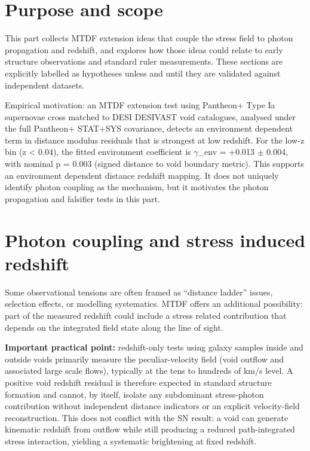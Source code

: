 \documentclass[11pt,a4paper]{article}
\begin{document}
\section{Purpose and scope}
\label{sec:purpose}
This part collects MTDF extension ideas that couple the stress field to photon propagation and redshift, and explores how those ideas could relate to early structure observations and standard ruler measurements.
These sections are explicitly labelled as hypotheses unless and until they are validated against independent datasets.

Empirical motivation: an MTDF extension test using Pantheon+ Type Ia supernovae cross matched to DESI DESIVAST void catalogues, analysed under the full Pantheon+ STAT+SYS covariance, detects an environment dependent term in distance modulus residuals that is strongest at low redshift. For the low-z bin (z < 0.04), the fitted environment coefficient is $\gamma$\_\allowbreak{}env = +0.013 $\pm$ 0.004, with nominal p = 0.003 (signed distance to void boundary metric). This supports an environment dependent distance redshift mapping. It does not uniquely identify photon coupling as the mechanism, but it motivates the photon propagation and falsifier tests in this part.

\section{Photon coupling and stress induced redshift}
\label{sec:photon}
Some observational tensions are often framed as ``distance ladder'' issues, selection effects, or modelling systematics.
MTDF offers an additional possibility: part of the measured redshift could include a stress related contribution that depends on the integrated field state along the line of sight.

\textbf{Important practical point:} redshift-only tests using galaxy samples inside and outside voids primarily measure the peculiar-velocity field (void outflow and associated large scale flows), typically at the tens to hundreds of km/\allowbreak{}s level. A positive void redshift residual is therefore expected in standard structure formation and cannot, by itself, isolate any subdominant stress-photon contribution without independent distance indicators or an explicit velocity-field reconstruction. This does not conflict with the SN result: a void can generate kinematic redshift from outflow while still producing a reduced path-integrated stress interaction, yielding a systematic brightening at fixed redshift.
\end{document}

